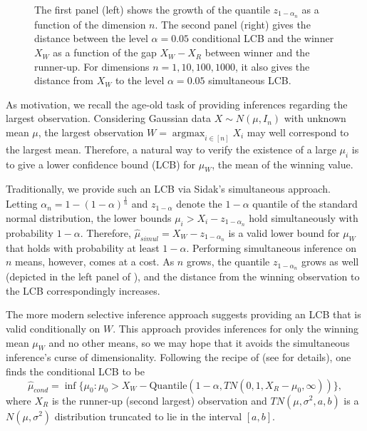\documentclass{article}
\DeclareMathOperator*{\argmax}{argmax}
\begin{document}
\begin{figure}
{\begin{minipage}{0.35\textwidth}
    \end{minipage}
    }
    \caption{ The first panel (left) shows the growth of the quantile $z_{1 - \alpha_n}$ as a function of the dimension $n$. The second panel (right) gives the distance between the level $\alpha=0.05$ conditional LCB and the winner $X_W$ as a function of the gap $X_W - X_R$ between winner and the runner-up. For dimensions $n=1,10,100,1000$, it also gives the distance from $X_W$ to the level $\alpha=0.05$ simultaneous LCB.}
    \label{fig:winner}
\end{figure}

As motivation, we recall the age-old task of providing inferences regarding the largest observation. Considering Gaussian data $X \sim N(\mu, I_n)$ with unknown mean $\mu$, the largest observation $W = \argmax_{i \in [n]} X_i$ may well correspond to the largest mean. Therefore, a natural way to verify the existence of a large $\mu_i$ is to give a lower confidence bound (LCB) for $\mu_W$, the mean of the winning value. 

Traditionally, we provide such an LCB via Sidak's simultaneous approach. Letting $\alpha_n = 1 - (1-\alpha)^\frac{1}{n}$ and $z_{1-\alpha}$ denote the $1-\alpha$ quantile of the standard normal distribution, the lower bounds $ \mu_i > X_i - z_{1 - \alpha_n}$ hold simultaneously with probability $1-\alpha$. Therefore, $\hat{\mu}_{simul} = X_W - z_{1 - \alpha_n}$ is a valid lower bound for $\mu_W$ that holds with probability at least $1-\alpha$. Performing simultaneous inference on $n$ means, however, comes at a cost. As $n$ grows, the quantile $z_{1 - \alpha_n}$ grows as well (depicted in the left panel of ), and the distance from the winning observation to the LCB correspondingly increases. 

The more modern selective inference approach suggests providing an LCB that is valid conditionally on $W$. This approach provides inferences for only the winning mean $\mu_W$ and no other means, so we may hope that it avoids the simultaneous inference's curse of dimensionality. Following the recipe of \cite{Fithian2017} (see  for details), one finds the conditional LCB to be 
\begin{equation}
    \label{eq:motivating_lcb}
    \hat{\mu}_{cond} = \inf \{\mu_0 : \mu_0 > X_W - \text{Quantile}(1-\alpha, TN(0, 1, X_R - \mu_0, \infty))  \},
\end{equation}
where $X_R$ is the runner-up (second largest) observation and $TN(\mu, \sigma^2, a, b)$ is a $N(\mu, \sigma^2)$ distribution truncated to lie in the interval $[a, b]$. 
\end{document}
